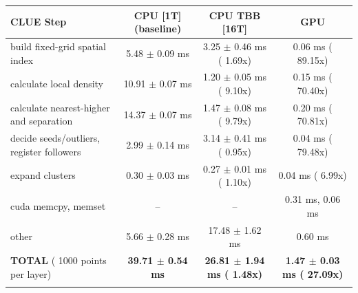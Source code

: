     \begin{tabular}{l|c|c|c}
    \hline
    CLUE Step                                 & CPU [1T] (baseline)         & CPU TBB [16T]                         & GPU                       \\ \hline
    build fixed-grid spatial index            &   5.48 $\pm$  0.09 ms       &   3.25 $\pm$  0.46 ms ( 1.69x)        &   0.06 ms ( 89.15x)       \\
    calculate local density                   &  10.91 $\pm$  0.07 ms       &   1.20 $\pm$  0.05 ms ( 9.10x)        &   0.15 ms ( 70.40x)       \\
    calculate nearest-higher and separation   &  14.37 $\pm$  0.07 ms       &   1.47 $\pm$  0.08 ms ( 9.79x)        &   0.20 ms ( 70.81x)       \\
    decide seeds/outliers, register followers &   2.99 $\pm$  0.14 ms       &   3.14 $\pm$  0.41 ms ( 0.95x)        &   0.04 ms ( 79.48x)       \\
    expand clusters                           &   0.30 $\pm$  0.03 ms       &   0.27 $\pm$  0.01 ms ( 1.10x)        &   0.04 ms (  6.99x)       \\ \hline
    cuda memcpy, memset                       & --                          & --                                    &   0.31 ms,   0.06 ms      \\
    other                                     &   5.66 $\pm$  0.28 ms       &  17.48 $\pm$  1.62 ms                 &   0.60 ms                 \\ \hline
    \textbf{TOTAL} ( 1000 points per layer)   & \textbf{ 39.71 $\pm$  0.54 ms} & \textbf{ 26.81 $\pm$  1.94 ms ( 1.48x)} & \textbf{  1.47 $\pm$  0.03 ms ( 27.09x)}  \\
    \hline
    \multicolumn{4}{c}{}
    \end{tabular}
    \linebreak


